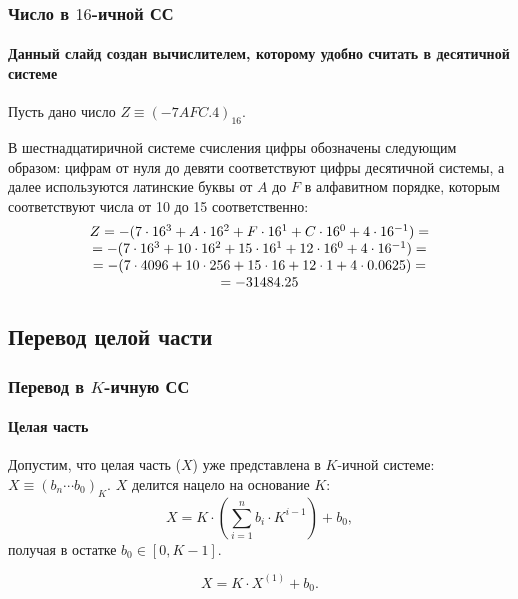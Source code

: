 \begin{frame}
    \frametitle{Число в $16$-ичной СС}
    \framesubtitle{Данный слайд создан вычислителем, которому удобно считать в десятичной системе}
    
    \begin{block}{}
        Пусть дано число $Z\equiv(-7AFC.4)_{16}$.

         В шестнадцатиричной системе счисления цифры обозначены следующим образом: цифрам от нуля до девяти соответствуют цифры десятичной системы, а далее используются латинские буквы от $A$ до $F$ в алфавитном порядке, которым соответствуют числа от 10 до 15 соответственно:
        \[
            \begin{array}[c]{c}
                Z=-(
                7\cdot 16^{3}+
                A\cdot 16^{2}+
                F\cdot 16^{1}+
                C\cdot 16^{0}+
                4\cdot 16^{-1})=\\
                =-(
                7\cdot 16^{3}+
                10\cdot 16^{2}+
                15\cdot 16^{1}+
                12\cdot 16^{0}+
                4\cdot 16^{-1})=\\
                =
                -(7\cdot 4096+
                10\cdot 256+
                15\cdot 16+
                12\cdot 1+
                4\cdot 0.0625)=\\
                = -31484.25
            \end{array}
        \]    
    \end{block}
\end{frame}


\subsection{Перевод целой части}

\begin{frame}
    \frametitle{Перевод в $K$-ичную СС}
    \framesubtitle{Целая часть}
    
    Допустим, что целая часть ($X$) уже представлена в $K$-ичной системе: $X\equiv(b_n\cdots b_0)_K$. $X$ делится нацело на основание $K$:
    \[
        X=K\cdot\left(\sum_{i=1}^{n}b_i\cdot K^{i-1}\right)+b_{0},
    \]
    получая в остатке $b_{0}\in[0,K-1]$.
    
    \[
        X=K\cdot X^{(1)} + b_{0}.
    \]
\end{frame}

